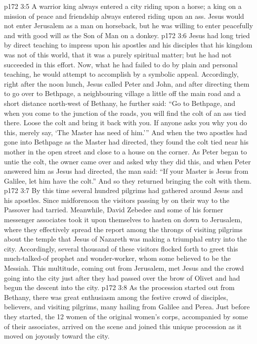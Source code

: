 \vs p172 3:5 \pc A warrior king always entered a city riding upon a horse; a king on a mission of peace and friendship always entered riding upon an ass. Jesus would not enter Jerusalem as a man on horseback, but he was willing to enter peacefully and with good will as the Son of Man on a donkey.
\vs p172 3:6 \pc Jesus had long tried by direct teaching to impress upon his apostles and his disciples that his kingdom was not of this world, that it was a purely spiritual matter; but he had not succeeded in this effort. Now, what he had failed to do by plain and personal teaching, he would attempt to accomplish by a symbolic appeal. Accordingly, right after the noon lunch, Jesus called Peter and John, and after directing them to go over to Bethpage, a neighbouring village a little off the main road and a short distance north\hyp{}west of Bethany, he further said: “Go to Bethpage, and when you come to the junction of the roads, you will find the colt of an ass tied there. Loose the colt and bring it back with you. If anyone asks you why you do this, merely say, ‘The Master has need of him.’” And when the two apostles had gone into Bethpage as the Master had directed, they found the colt tied near his mother in the open street and close to a house on the corner. As Peter began to untie the colt, the owner came over and asked why they did this, and when Peter answered him as Jesus had directed, the man said: “If your Master is Jesus from Galilee, let him have the colt.” And so they returned bringing the colt with them.
\vs p172 3:7 By this time several hundred pilgrims had gathered around Jesus and his apostles. Since midforenoon the visitors passing by on their way to the Passover had tarried. Meanwhile, David Zebedee and some of his former messenger associates took it upon themselves to hasten on down to Jerusalem, where they effectively spread the report among the throngs of visiting pilgrims about the temple that Jesus of Nazareth was making a triumphal entry into the city. Accordingly, several thousand of these visitors flocked forth to greet this much\hyp{}talked\hyp{}of prophet and wonder\hyp{}worker, whom some believed to be the Messiah. This multitude, coming out from Jerusalem, met Jesus and the crowd going into the city just after they had passed over the brow of Olivet and had begun the descent into the city.
\vs p172 3:8 As the procession started out from Bethany, there was great enthusiasm among the festive crowd of disciples, believers, and visiting pilgrims, many hailing from Galilee and Perea. Just before they started, the 12 women of the original women’s corps, accompanied by some of their associates, arrived on the scene and joined this unique procession as it moved on joyously toward the city.
